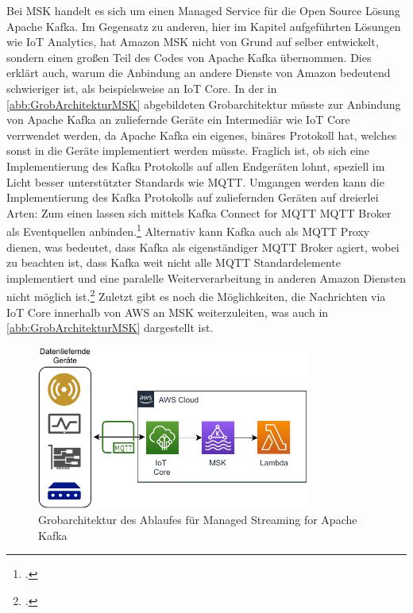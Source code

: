 Bei \ac{MSK} handelt es sich um einen Managed Service für die Open Source Lösung Apache Kafka. Im Gegensatz zu anderen, hier im Kapitel aufgeführten Lösungen wie \ac{IoT} Analytics, hat Amazon \ac{MSK} nicht von Grund auf selber entwickelt, sondern einen großen Teil des Codes von Apache Kafka übernommen. Dies erklärt auch, warum die Anbindung an andere Dienste von Amazon bedeutend schwieriger ist, als beispielsweise an \ac{IoT} Core. In der in \autoref{abb:GrobArchitekturMSK} abgebildeten Grobarchitektur müsste zur Anbindung von Apache Kafka an zuliefernde Geräte ein Intermediär wie \ac{IoT} Core verrwendet werden, da Apache Kafka ein eigenes, binäres Protokoll hat, welches sonst in die Geräte implementiert werden müsste.  Fraglich ist, ob sich eine Implementierung des Kafka Protokolls auf allen Endgeräten lohnt, speziell im Licht besser unterstützter Standards wie \ac{MQTT}. Umgangen werden kann die Implementierung des Kafka Protokolls auf zuliefernden Geräten auf dreierlei Arten: Zum einen lassen sich mittels Kafka Connect for \ac{MQTT} \ac{MQTT} Broker als Eventquellen anbinden.\footcite[Vgl.][]{Erber.12.01.2021} Alternativ kann Kafka auch als \ac{MQTT} Proxy dienen, was bedeutet, dass Kafka als eigenständiger MQTT Broker agiert, wobei zu beachten ist, dass Kafka weit nicht alle \ac{MQTT} Standardelemente implementiert und eine paralelle Weiterverarbeitung in anderen Amazon Diensten nicht möglich ist.\footcite[Vgl.][]{Erber.12.01.2021} Zuletzt gibt es noch die Möglichkeiten, die Nachrichten via \ac{IoT} Core innerhalb von \ac{AWS} an \ac{MSK} weiterzuleiten, was auch in \autoref{abb:GrobArchitekturMSK} dargestellt ist.
\begin{figure}[H]
\centering
\includegraphics[width=0.8\textwidth]{graphics/MSK-general.pdf}
\caption{Grobarchitektur des Ablaufes für Managed Streaming for Apache Kafka}
\label{abb:GrobArchitekturMSK}
\end{figure}

